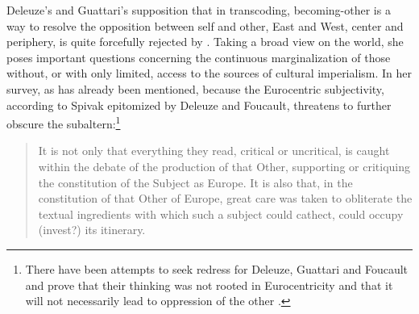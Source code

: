 \documentclass[a4paper]{article}
\begin{document}

Deleuze's and Guattari's supposition that in transcoding, becoming-other is a way to resolve the opposition between self and other, East and West, center and periphery, is quite forcefully rejected by \autocite{spivak1988}. Taking a broad view on the world, she poses important questions concerning the continuous marginalization of those without, or with only limited, access to the sources of cultural imperialism. In her survey, as has already been mentioned, because the Eurocentric subjectivity, according to Spivak epitomized by Deleuze and Foucault, threatens to further obscure the subaltern:\footnote{There have been attempts to seek redress for Deleuze, Guattari and Foucault and prove that their thinking was not rooted in Eurocentricity and that it will not necessarily lead to oppression of the other \autocite[See e.g.][]{robinson2010}.}

\begin{quote}
  It is not only that everything they read, critical or uncritical, is caught within the debate   of the production of that Other, supporting or critiquing the constitution of the Subject as   Europe.  It is also that, in the constitution of that Other of Europe, great care was taken to   obliterate the textual ingredients with which such a subject could cathect, could occupy (invest?) its   itinerary. \autocite[75]{spivak1988}
\end{quote}
\end{document}
